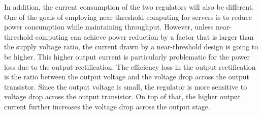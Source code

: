 In addition, the current consumption of the two regulators will also be
different. One of the goals of employing near-threshold computing for servers is
to reduce power consumption while maintaining throughput. However, unless
near-threshold computing can achieve power reduction by a factor that is larger
than the supply voltage ratio, the current drawn by a near-threshold design is
going to be higher. This higher output current is particularly problematic for
the power loss due to the output rectification. The efficiency loss in the
output rectification is the ratio between the output voltage and the voltage
drop across the output transistor. Since the output voltage is small, the
regulator is more sensitive to voltage drop across the output transistor. On top
of that, the higher output current further increases the voltage drop across the
output stage.  

